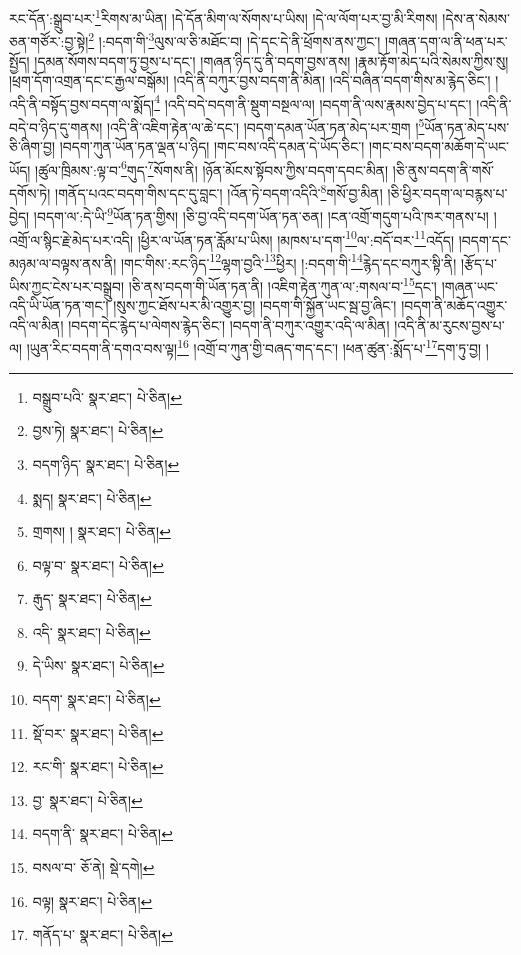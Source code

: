 རང་དོན་:སྒྲུབ་པར་\footnote{བསྒྲུབ་པའི་  སྣར་ཐང་།  པེ་ཅིན། }རིགས་མ་ཡིན། །དེ་དོན་མིག་ལ་སོགས་པ་ཡིས། །དེ་ལ་ལོག་པར་བྱ་མི་རིགས། །དེས་ན་སེམས་ཅན་གཙོར་:བྱ་སྟེ།\footnote{བྱས་ཏེ།  སྣར་ཐང་།  པེ་ཅིན། } །:བདག་གི་\footnote{བདག་ཉིད་  སྣར་ཐང་།  པེ་ཅིན། }ལུས་ལ་ཅི་མཐོང་བ། །དེ་དང་དེ་ནི་ཕྲོགས་ནས་ཀྱང་། །གཞན་དག་ལ་ནི་ཕན་པར་སྤྱོད། །དམན་སོགས་བདག་ཏུ་བྱས་པ་དང་། །གཞན་ཉིད་དུ་ནི་བདག་བྱས་ནས། །རྣམ་རྟོག་མེད་པའི་སེམས་ཀྱིས་སུ། །ཕྲག་དོག་འགྲན་དང་ང་རྒྱལ་བསྒོམ། །འདི་ནི་བཀུར་བྱས་བདག་ནི་མིན། །འདི་བཞིན་བདག་གིས་མ་རྙེད་ཅིང་། །འདི་ནི་བསྟོད་བྱས་བདག་ལ་སྨོད།\footnote{སྨད།  སྣར་ཐང་།  པེ་ཅིན། } །འདི་བདེ་བདག་ནི་སྡུག་བསྔལ་ལ། །བདག་ནི་ལས་རྣམས་བྱེད་པ་དང་། །འདི་ནི་བདེ་བ་ཉིད་དུ་གནས། །འདི་ནི་འཇིག་རྟེན་ལ་ཆེ་དང་། །བདག་དམན་ཡོན་ཏན་མེད་པར་གྲག །\footnote{གྲགས། །  སྣར་ཐང་།  པེ་ཅིན། }ཡོན་ཏན་མེད་པས་ཅི་ཞིག་བྱ། །བདག་ཀུན་ཡོན་ཏན་ལྡན་པ་ཉིད། །གང་བས་འདི་དམན་དེ་ཡོད་ཅིང་། །གང་བས་བདག་མཆོག་དེ་ཡང་ཡོད། །ཚུལ་ཁྲིམས་:ལྟ་བ་\footnote{བལྟ་བ་  སྣར་ཐང་།  པེ་ཅིན། }གུད་\footnote{རྒུད་  སྣར་ཐང་།  པེ་ཅིན། }སོགས་ནི། །ཉོན་མོངས་སྟོབས་ཀྱིས་བདག་དབང་མིན། །ཅི་ནུས་བདག་ནི་གསོ་དགོས་ཏེ། །གནོད་པའང་བདག་གིས་དང་དུ་བླང་། །འོན་ཏེ་བདག་འདིའི་\footnote{འདི་  སྣར་ཐང་།  པེ་ཅིན། }གསོ་བྱ་མིན། །ཅི་ཕྱིར་བདག་ལ་བརྙས་པ་བྱེད། །བདག་ལ་:དེ་ཡི་\footnote{དེ་ཡིས་  སྣར་ཐང་།  པེ་ཅིན། }ཡོན་ཏན་གྱིས། །ཅི་བྱ་འདི་བདག་ཡོན་ཏན་ཅན། །ངན་འགྲོ་གདུག་པའི་ཁར་གནས་པ། །འགྲོ་ལ་སྙིང་རྗེ་མེད་པར་འདི། །ཕྱིར་ལ་ཡོན་ཏན་རློམ་པ་ཡིས། །མཁས་པ་དག་\footnote{བདག་  སྣར་ཐང་།  པེ་ཅིན། }ལ་:བདོ་བར་\footnote{སྡོ་བར་  སྣར་ཐང་།  པེ་ཅིན། }འདོད། །བདག་དང་མཉམ་ལ་བལྟས་ནས་ནི། །གང་གིས་:རང་ཉིད་\footnote{རང་གི་  སྣར་ཐང་།  པེ་ཅིན། }ལྷག་བྱའི་\footnote{བྱ་  སྣར་ཐང་།  པེ་ཅིན། }ཕྱིར། །:བདག་གི་\footnote{བདག་ནི་  སྣར་ཐང་།  པེ་ཅིན། }རྙེད་དང་བཀུར་སྟི་ནི། །རྩོད་པ་ཡིས་ཀྱང་ངེས་པར་བསྒྲུབ། །ཅི་ནས་བདག་གི་ཡོན་ཏན་ནི། །འཇིག་རྟེན་ཀུན་ལ་:གསལ་བ་\footnote{བསལ་བ་  ཅོ་ནེ།  སྡེ་དགེ། }དང་། །གཞན་ཡང་འདི་ཡི་ཡོན་ཏན་གང་། །སུས་ཀྱང་ཐོས་པར་མི་འགྱུར་བྱ། །བདག་གི་སྐྱོན་ཡང་སྦ་བྱ་ཞིང་། །བདག་ནི་མཆོད་འགྱུར་འདི་ལ་མིན། །བདག་དེང་རྙེད་པ་ལེགས་རྙེད་ཅིང་། །བདག་ནི་བཀུར་འགྱུར་འདི་ལ་མིན། །འདི་ནི་མ་རུངས་བྱས་པ་ལ། །ཡུན་རིང་བདག་ནི་དགའ་བས་ལྟ།\footnote{བལྟ།  སྣར་ཐང་།  པེ་ཅིན། } །འགྲོ་བ་ཀུན་གྱི་བཞད་གད་དང་། །ཕན་ཚུན་:སྨོད་པ་\footnote{གནོད་པ་  སྣར་ཐང་།  པེ་ཅིན། }དག་ཏུ་བྱ། །
